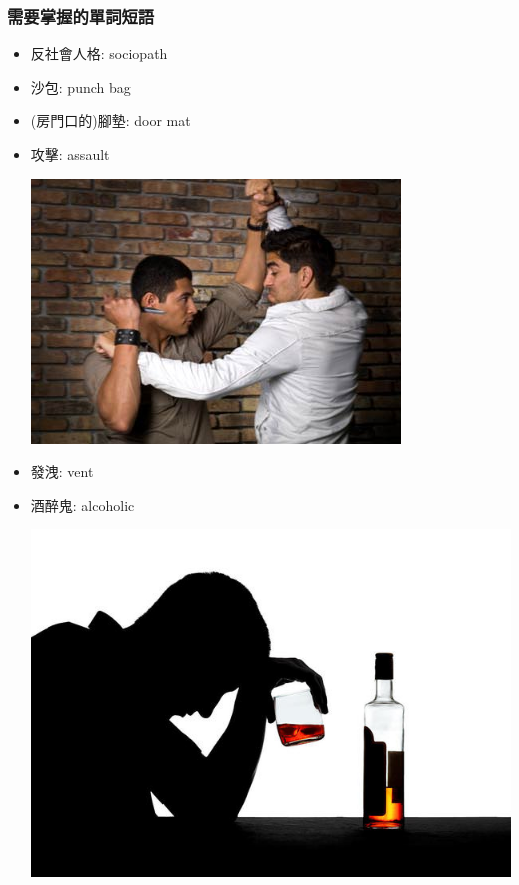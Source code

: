 \subsubsection*{需要掌握的單詞短語}
\begin{multicols}{2}
\begin{itemize}
  \itemsep0em
  \item 反社會人格: sociopath
  \item 沙包: punch bag
  \item (房門口的)腳墊: door mat
  \item 攻擊: assault
  \begin{center}
    \includegraphics[scale=.6]{pics/assault}
  \end{center}
  \item 發洩: vent
  \item 酒醉鬼: alcoholic
  \begin{center}
    \includegraphics[scale=.35]{pics/alcoholic}
  \end{center}

\end{itemize}
\end{multicols}
